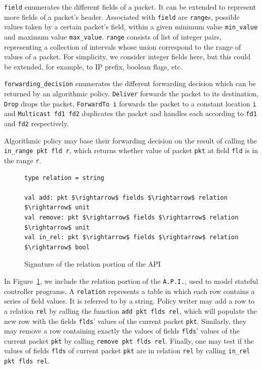 \documentclass[preprint]{sigplanconf}
\begin{document}
\lstinline|field| enumerates the different fields of a packet. It can be extended to represent more fields of a packet's header. Associated with \lstinline|field| are \lstinline|range|s, possible values taken by a certain packet's field, within a given minimum value \lstinline|min_value| and maximum value \lstinline|max_value|. \lstinline|range| consists of list of integer pairs, representing a collection of intervals whose union correspond to the range of values of a packet. For simplicity, we consider integer fields here, but this could be extended, for example, to IP prefix, boolean flags, etc.

\lstinline|forwarding_decision| enumerates the different forwarding decision which can be returned by an algorithmic policy. \lstinline|Deliver| forwards the packet to its destination, \lstinline|Drop| drops the packet, \lstinline|ForwardTo i| forwards the packet to a constant location \lstinline|i| and \lstinline|Multicast fd1 fd2| duplicates the packet and handles each according to \lstinline|fd1| and \lstinline|fd2| respectively.

Algorithmic policy may base their forwarding decision on the result of calling the \lstinline|in_range pkt fld r|, which returns whether value of packet \lstinline|pkt| at field \lstinline|fld| is in the range \lstinline|r|.

\begin{figure}[ht]
  \begin{lstlisting}[mathescape]
type relation = string

val add: pkt $\rightarrow$ fields $\rightarrow$ relation $\rightarrow$ unit
val remove: pkt $\rightarrow$ fields $\rightarrow$ relation $\rightarrow$ unit
val in_rel: pkt $\rightarrow$ fields $\rightarrow$ relation $\rightarrow$ bool
\end{lstlisting}

\caption{Signature of the relation portion of the API}
\label{fig:rel_api}
\end{figure}


In Figure~\ref{fig:rel_api}, we include the relation portion of the \lstinline|A.P.I.|, used to model stateful controller programs. A \lstinline|relation| represents a table in which each row contains a series of field values. It is referred to by a string. Policy writer may add a row to a relation \lstinline|rel| by calling the function \lstinline|add pkt flds rel|, which will populate the new row with the fields \lstinline|flds|' values of the current packet \lstinline|pkt|. Similarly, they may remove a row containing exactly the values of fields \lstinline|flds|' values of the current packet \lstinline|pkt| by calling \lstinline|remove pkt flds rel|. Finally, one may test if the values of fields \lstinline|flds| of current packet \lstinline|pkt| are in relation \lstinline|rel| by calling \lstinline|in_rel pkt flds rel|.
\end{document}
